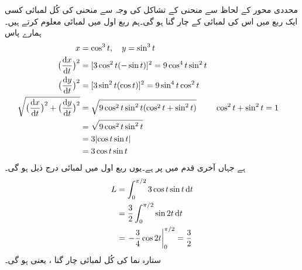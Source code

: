 محددی محور کے لحاظ سے منحنی کے  تشاکل کی وجہ سے منحنی کی  کُل لمبائی کسی ایک ربع میں اس کی لمبائی کے چار گنا ہو گی۔ہم  ربع اول میں لمبائی معلوم کرتے ہیں۔ہمارے پاس
\begin{align*}
x&=\cos^3t,\quad y=\sin^3t\\
\big(\frac{\dif x}{\dif t}\big)^2&=[3\cos^2t(-\sin t)]^2=9\cos^4t\sin^2t\\
\big(\frac{\dif y}{\dif t}\big)^2&=[3\sin^2t(\cos t)]^2=9\sin^4t\cos^2t\\
\sqrt{\big(\frac{\dif x}{\dif t}\big)^2+\big(\frac{\dif y}{\dif t}\big)^2}&=\sqrt{9\cos^2t\sin^2t(\cos^2t+\sin^2t)}&&\cos^2t+\sin^2t=1\\
&=\sqrt{9\cos^2t\sin^2t}\\
&=3\abs{\cos t\sin t}\\
&=3\cos t\sin t&
\end{align*} 
ہے جہاں آخری قدم میں  پر  ہے۔یوں ربع اول میں لمبائی درج ذیل ہو گی۔
\begin{align*}
L&=\int_{0}^{\pi/2}3\cos t\sin t\dif t\\
&=\frac{3}{2}\int_0^{\pi/2}\sin 2t\dif t\\
&=\left.-\frac{3}{4}\cos 2t\right\vert_{0}^{\pi/2}=\frac{3}{2}
\end{align*}
ستارہ نما کی کُل  لمبائی چار گنا ، یعنی  ہو گی۔

